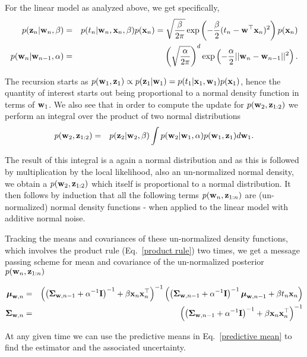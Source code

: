 \documentclass[A4,12pt]{article}    %
\def\xb{{\bf x}}
\def\zb{{\bf z}}
\def\wb{{\bf w}}
\def\mub{\text{\boldmath $\mu$}}
\def\Sigb{\text{\boldmath $\Sigma$}}
\def\xb{{\bf x}}
\begin{document}
For the linear model as analyzed above, we get specifically,
\begin{eqnarray}
 p(\zb_n|\wb_n,\beta)   &=& p(t_n|\wb_n,\xb_n,\beta)p(\xb_n) = \sqrt{\frac{\beta}{2\pi}}\exp\left(-\frac{\beta}{2}(t_n-\wb^{\top}\xb_n )^2 \right)p(\xb_n) \nonumber \\
 p(\wb_n|\wb_{n-1},\alpha) &=&  \left(\sqrt{\frac{\alpha}{2\pi}}\right)^{d} \exp\left(-\frac{\alpha}{2}||\wb_n-\wb_{n-1}||^2\right). \nonumber
\end{eqnarray}

The recursion starts as  $p(\wb_1 ,\zb_1) \propto p(\zb_{1}|\wb_1) = p(t_{1}|\xb_1,\wb_1)p(\xb_1)$, hence the quantity of interest starts out being proportional to a normal density function in terms of $\wb_1$.
We also see that in order to compute the update for $p(\wb_2 ,\zb_{1:2})$ we perform an integral over the product of two normal distributions
\begin{eqnarray}
 p(\wb_2 ,\zb_{1:2}) &=& p(\zb_{2}|\wb_2,\beta)\int p(\wb_2 | \wb_1,\alpha)p(\wb_1,\zb_1)d\wb_{1}.
\end{eqnarray}

 The result of this integral is a again a normal distribution and as this is followed by multiplication by the local likelihood, also an un-normalized normal density, we obtain a $p(\wb_2 ,\zb_{1:2})$ which itself is proportional to a normal distribution. It then follows by induction that all the following terms $p(\wb_n ,\zb_{1:n})$ are (un-normalized) normal density functions - when applied to the linear model with additive normal noise.

 Tracking the  means and covariances of these un-normalized density functions, which involves the product rule (Eq.\ \ref{product rule}) two times, we get a message passing scheme for mean and covariance of the un-normalized posterior $ p(\wb_n , \zb_{1:n}) $

\begin{eqnarray}
  \mub_{\wb,n} & = &  \left( \left( \Sigb_{\wb,n-1} + \alpha^{-1}{\bf I}\right)^{-1} + \beta\xb_n\xb_n^{\top}\right)^{-1}\left(  \left(\Sigb_{\wb,n-1} + \alpha^{-1}{\bf I}\right)^{-1}\mub_{\wb,n-1} + \beta t_n\xb_n\right) \nonumber \\
  \Sigb_{\wb,n} & = & \left( \left(\Sigb_{\wb,n-1} + \alpha^{-1}{\bf I}\right)^{-1} + \beta\xb_n\xb_n^{\top}\right)^{-1}
  \end{eqnarray}

At any given time we can use the predictive means in Eq.\ \ref{predictive mean} to find the estimator and the associated uncertainty.
\end{document}
